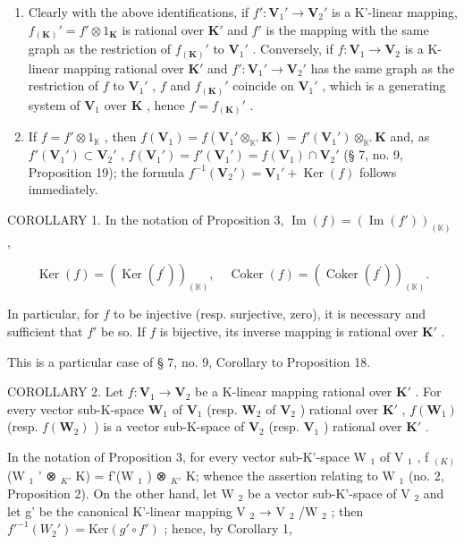 \begin{enumerate}
\def\labelenumi{(\roman{enumi})}
\item
  Clearly with the above identifications, if \(f': \mathbf{V}_1' \to \mathbf{V}_2'\) is a K'-linear mapping, \(f_{(\mathbf{K})}' = f' \otimes 1_{\mathbf{K}}\) is rational over \(\mathbf{K}'\) and \(f'\) is the mapping with the same graph as the restriction of \(f_{(\mathbf{K})}'\) to \(\mathbf{V}_1'\) . Conversely, if \(f: \mathbf{V}_1 \to \mathbf{V}_2\) is a K-linear mapping rational over \(\mathbf{K}'\) and \(f': \mathbf{V}_1' \to \mathbf{V}_2'\) has the same graph as the restriction of \(f\) to \(\mathbf{V}_1'\) , \(f\) and \(f_{(\mathbf{K})}'\) coincide on \(\mathbf{V}_1'\) , which is a generating system of \(\mathbf{V}_1\) over \(\mathbf{K}\) , hence \(f = f_{(\mathbf{K})}'\) .
\item
  If \(f = f' \otimes 1_{\mathbb{K}}\) , then \(f(\mathbf{V}_1) = f(\mathbf{V}_1' \otimes_{\mathbb{K}'} \mathbf{K}) = f'(\mathbf{V}_1') \otimes_{\mathbb{K}'} \mathbf{K}\) and, as \(f'(\mathbf{V}_1') \subset \mathbf{V}_2'\) , \(f(\mathbf{V}_1') = f'(\mathbf{V}_1') = f(\mathbf{V}_1) \cap \mathbf{V}_2'\) (§ 7, no. 9, Proposition 19); the formula \(f^{-1}(\mathbf{V}_2') = \mathbf{V}_1' + \operatorname{Ker}(f)\) follows immediately.
\end{enumerate}

COROLLARY 1. In the notation of Proposition 3, \(\operatorname{Im}(f) = (\operatorname{Im}(f'))_{(\mathbb{K})}\) ,

\[
\operatorname{Ker} (f) = (\operatorname{Ker} (f ^ {\prime})) _ {(\mathbb {K})}, \quad \operatorname{Coker} (f) = (\operatorname{Coker} (f ^ {\prime})) _ {(\mathbb {K})}.
\]

In particular, for \(f\) to be injective (resp. surjective, zero), it is necessary and sufficient that \(f'\) be so. If \(f\) is bijective, its inverse mapping is rational over \(\mathbf{K}'\) .

This is a particular case of § 7, no. 9, Corollary to Proposition 18.

COROLLARY 2. Let \(f: \mathbf{V}_1 \to \mathbf{V}_2\) be a K-linear mapping rational over \(\mathbf{K}'\) . For every vector sub-K-space \(\mathbf{W}_1\) of \(\mathbf{V}_1\) (resp. \(\mathbf{W}_2\) of \(\mathbf{V}_2\) ) rational over \(\mathbf{K}'\) , \(f(\mathbf{W}_1)\) (resp. \(f(\mathbf{W}_2)\) ) is a vector sub-K-space of \(\mathbf{V}_2\) (resp. \(\mathbf{V}_1\) ) rational over \(\mathbf{K}'\) .

In the notation of Proposition 3, for every vector sub-K'-space W \(_{1}\) of V \(_{1}\) , f \(_{(K)}\) (W \(_{1}\) ' ⊗ \(_{K'}\) K) = f'(W \(_{1}\) ) ⊗ \(_{K'}\) K; whence the assertion relating to W \(_{1}\) (no. 2, Proposition 2). On the other hand, let W \(_{2}\) be a vector sub-K'-space of V \(_{2}\) and let g' be the canonical K'-linear mapping V \(_{2}\) → V \(_{2}\) /W \(_{2}\) ; then \(f'^{-1}(W_{2}') = \text{Ker}(g' \circ f')\) ; hence, by Corollary 1,


